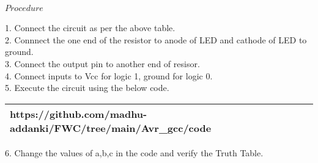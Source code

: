 \documentclass[journal,12pt,twocolumn]{IEEEtran}
\begin{document}
    \paragraph{$Procedure$}
    
    1. Connect the circuit as per the above table.\\
    2. Connnect the one end of the resistor to anode of LED and cathode of LED to ground.\\
    3. Connect the output pin to another end of resisor.\\
    4. Connect inputs to Vcc for logic 1, ground for logic 0.\\
    5. Execute the circuit using the below code.\\
   
\begin{tabularx}{0.46\textwidth} { 
  | >{\centering\arraybackslash}X |}
  \hline
  https://github.com/madhu-addanki/FWC/tree/main/Avr_gcc/code\\
  \hline
\end{tabularx}
   
6. Change the values of a,b,c in the code and verify the Truth Table.\\

\end{document}
